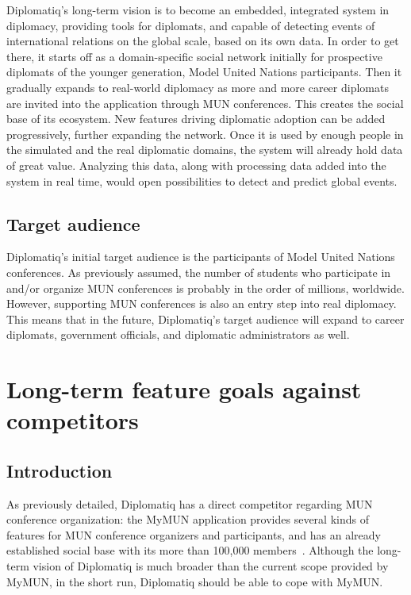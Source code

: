 Diplomatiq's long-term vision is to become an embedded, integrated system in diplomacy, providing tools for diplomats, and capable of detecting events of international relations on the global scale, based on its own data. In order to get there, it starts off as a domain-specific social network initially for prospective diplomats of the younger generation, Model United Nations participants. Then it gradually expands to real-world diplomacy as more and more career diplomats are invited into the application through MUN conferences. This creates the social base of its ecosystem. New features driving diplomatic adoption can be added progressively, further expanding the network. Once it is used by enough people in the simulated and the real diplomatic domains, the system will already hold data of great value. Analyzing this data, along with processing data added into the system in real time, would open possibilities to detect and predict global events.

\subsection{Target audience}

Diplomatiq's initial target audience is the participants of Model United Nations conferences. As previously assumed, the number of students who participate in and/or organize MUN conferences is probably in the order of millions, worldwide. However, supporting MUN conferences is also an entry step into real diplomacy. This means that in the future, Diplomatiq's target audience will expand to career diplomats, government officials, and diplomatic administrators as well.

\section{Long-term feature goals against competitors}

\subsection{Introduction}

As previously detailed, Diplomatiq has a direct competitor regarding MUN conference organization: the MyMUN application provides several kinds of features for MUN conference organizers and participants, and has an already established social base with its more than 100,000 members~\cite{mymunwebsite}. Although the long-term vision of Diplomatiq is much broader than the current scope provided by MyMUN, in the short run, Diplomatiq should be able to cope with MyMUN.

